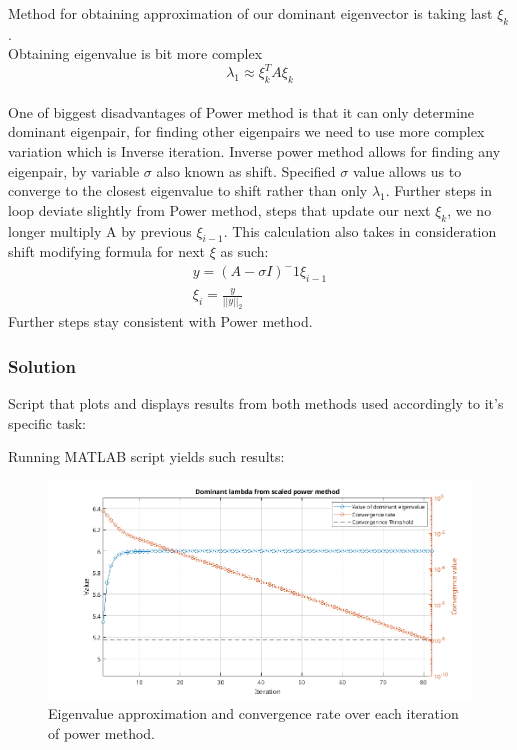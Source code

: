 Method for obtaining approximation of our dominant eigenvector is taking last $\xi_k$.\\
Obtaining eigenvalue is bit more complex
\begin{equation*}
    \lambda_1 \approx \xi_k^T A \xi_k 
\end{equation*}
\\
One of biggest disadvantages of Power method is that it can only determine dominant eigenpair, for finding other eigenpairs we need to use more complex variation which is Inverse iteration.
Inverse power method allows for finding any eigenpair, by variable $\sigma$ also known as shift\cite{Demmel}.
Specified $\sigma$ value allows us to converge to the closest eigenvalue to shift rather than only $\lambda_1$. Further steps in loop deviate slightly from Power method, steps that update our next $\xi_k$, we no longer multiply A by previous $\xi_{i-1}$. This calculation also takes in consideration shift modifying formula for next $\xi$ as such:
\begin{equation*}
    \begin{matrix}
        y = (A - \sigma I)^-1 \xi_{i-1}\\
        \xi_i = \frac{y}{||y||_2}
    \end{matrix}
\end{equation*}
Further steps stay consistent with Power method.

\subsubsection*{Solution}
Script that plots and displays results from both methods used accordingly to it's specific task:


Running MATLAB script yields such results:


\begin{figure}[H]
    \centering
    \includegraphics[width=1\textwidth]{problems/Figures/Problem2ScaledPowerMethod.png}
    \caption{Eigenvalue approximation and convergence rate over each iteration of power method.}
    \label{fig:Power}
\end{figure}

